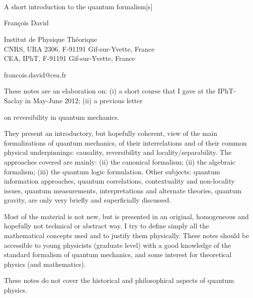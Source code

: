 \documentclass[a4paper,12pt,eqsecnum,titlepage,portrait]{book}
\numberwithin{equation}{section} %
\begin{document}

\frontmatter
\begin{titlepage}
\begin{center}
{\Huge{\ \\ \ \\ \ \\ A short introduction to the quantum formalism[s]}}
\end{center}
\begin{center}
{\Large{Fran\c{c}ois David}}
\end{center}
\begin{center}
{\large Institut de Physique Th\'eorique\\
CNRS, URA 2306, F-91191 Gif-sur-Yvette, France\\
CEA, IPhT, F-91191 Gif-sur-Yvette, France
}
\end{center}
\begin{center}
{francois.david@cea.fr}
\end{center}
\date{}


\begin{center}
\end{center}


These notes are an elaboration on: (i) a short course that I gave at the IPhT-Saclay in May-June 2012; (ii) 
 a previous letter 

\cite{PhysRevLett.107.180401} on reversibility in quantum mechanics.

They present an introductory, but hopefully coherent, view of the main formalizations of quantum mechanics, of their interrelations and of their common physical  underpinnings: 
causality, reversibility and locality/separability.
The approaches covered are mainly: (ii)  the canonical formalism; (ii)  the algebraic formalism; (iii)  the quantum logic formulation. 
Other subjects: quantum information approaches, quantum correlations, contextuality and non-locality issues, quantum measurements, interpretations and alternate theories, quantum gravity, are only very briefly and superficially discussed.

Most of the material is not new, but is presented in an original, homogeneous and hopefully not technical or abstract  way. I try to define simply all the mathematical concepts used and to justify them physically. 
These notes should be accessible to young physicists (graduate level) with a good knowledge of the standard formalism of quantum mechanics, and some interest for theoretical physics (and mathematics).

These notes do not cover the historical and philosophical aspects of quantum physics.
\vfill


\end{titlepage}
%
\end{document}

